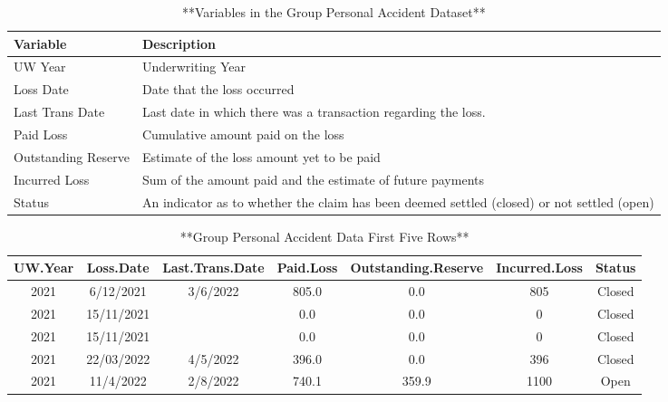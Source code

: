 \documentclass[
]{book}
\begin{document}
\begin{table}

\caption{\label{tab:DescribeGPA}**Variables in the Group Personal Accident Dataset**}
\centering
\begin{tabular}[t]{ll}
\toprule
Variable & Description\\
\midrule
UW Year & Underwriting Year\\
Loss Date & Date that the loss occurred\\
Last Trans Date & Last date in which there was a transaction regarding the loss.\\
Paid Loss & Cumulative amount paid on the loss\\
Outstanding Reserve & Estimate of the loss amount yet to be paid\\
\addlinespace
Incurred Loss & Sum of the amount paid and the estimate of future payments\\
Status & An indicator as to whether the claim has been deemed settled (closed) or not settled (open)\\
\bottomrule
\end{tabular}
\end{table}

\begin{table}

\caption{\label{tab:PrintNumGPA}**Group Personal Accident  Data First Five Rows**}
\centering
\begin{tabular}[t]{c|c|c|c|c|c|c}
\hline
UW.Year & Loss.Date & Last.Trans.Date & Paid.Loss & Outstanding.Reserve & Incurred.Loss & Status\\
\hline
2021 & 6/12/2021 & 3/6/2022 & 805.0 & 0.0 & 805 & Closed\\
\hline
2021 & 15/11/2021 &  & 0.0 & 0.0 & 0 & Closed\\
\hline
2021 & 15/11/2021 &  & 0.0 & 0.0 & 0 & Closed\\
\hline
2021 & 22/03/2022 & 4/5/2022 & 396.0 & 0.0 & 396 & Closed\\
\hline
2021 & 11/4/2022 & 2/8/2022 & 740.1 & 359.9 & 1100 & Open\\
\hline
\end{tabular}
\end{table}
\end{document}
